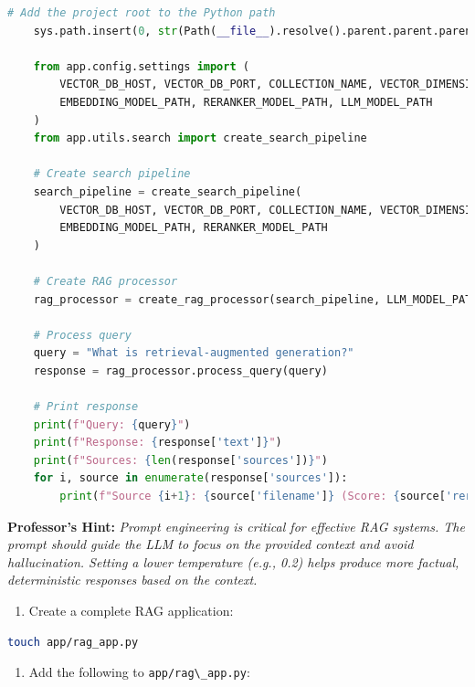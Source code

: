 \documentclass[
  screen,review,acmlarge]{acmart}
\newcommand{\passthrough}[1]{#1}
\providecommand{\tightlist}{%
  \setlength{\itemsep}{0pt}\setlength{\parskip}{0pt}}
\begin{document}
\begin{lstlisting}[language=Python]
    # Add the project root to the Python path
    sys.path.insert(0, str(Path(__file__).resolve().parent.parent.parent))
    
    from app.config.settings import (
        VECTOR_DB_HOST, VECTOR_DB_PORT, COLLECTION_NAME, VECTOR_DIMENSION,
        EMBEDDING_MODEL_PATH, RERANKER_MODEL_PATH, LLM_MODEL_PATH
    )
    from app.utils.search import create_search_pipeline
    
    # Create search pipeline
    search_pipeline = create_search_pipeline(
        VECTOR_DB_HOST, VECTOR_DB_PORT, COLLECTION_NAME, VECTOR_DIMENSION,
        EMBEDDING_MODEL_PATH, RERANKER_MODEL_PATH
    )
    
    # Create RAG processor
    rag_processor = create_rag_processor(search_pipeline, LLM_MODEL_PATH)
    
    # Process query
    query = "What is retrieval-augmented generation?"
    response = rag_processor.process_query(query)
    
    # Print response
    print(f"Query: {query}")
    print(f"Response: {response['text']}")
    print(f"Sources: {len(response['sources'])}")
    for i, source in enumerate(response['sources']):
        print(f"Source {i+1}: {source['filename']} (Score: {source['rerank_score']:.4f})")
\end{lstlisting}

\textbf{Professor's Hint:} \emph{Prompt engineering is critical for effective RAG systems. The prompt should guide the LLM to focus on the provided context and avoid hallucination. Setting a lower temperature (e.g., 0.2) helps produce more factual, deterministic responses based on the context.}

\begin{enumerate}
\def\labelenumi{\arabic{enumi}.}
\setcounter{enumi}{2}
\tightlist
\item
  Create a complete RAG application:
\end{enumerate}

\begin{lstlisting}[language=bash]
touch app/rag_app.py
\end{lstlisting}

\begin{enumerate}
\def\labelenumi{\arabic{enumi}.}
\setcounter{enumi}{3}
\tightlist
\item
  Add the following to \passthrough{\lstinline!app/rag\_app.py!}:
\end{enumerate}
\end{document}
